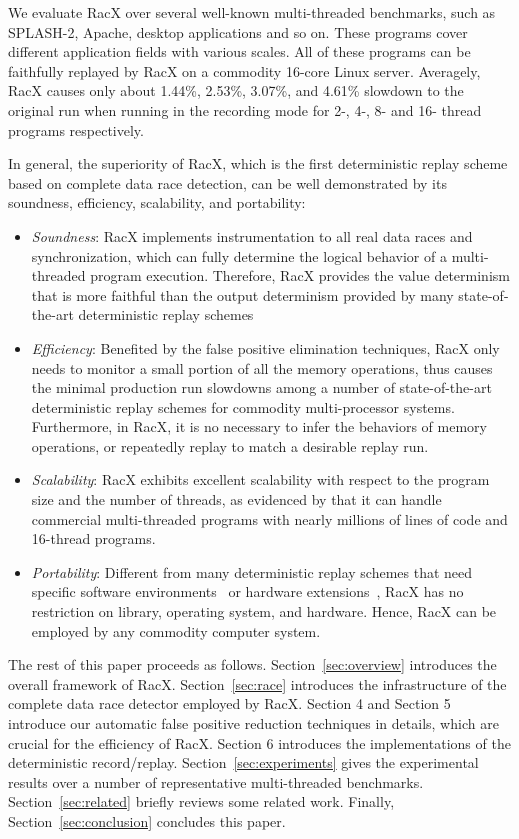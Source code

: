 \documentclass[10pt,onecolumn,letterpaper]{article}
\begin{document}
We evaluate RacX over several well-known multi-threaded benchmarks,
such as SPLASH-2, Apache, desktop applications and so on. These
programs cover different application fields with various scales. All
of these programs can be faithfully replayed by RacX on a commodity
16-core Linux server. Averagely, RacX causes only about 1.44\%,
2.53\%, 3.07\%, and 4.61\% slowdown to the original run when running
in the recording mode for 2-, 4-, 8- and 16- thread programs
respectively.

In general, the superiority of RacX, which is the first
deterministic replay scheme based on complete data race detection,
can be well demonstrated by its soundness, efficiency, scalability,
and portability:
\begin{itemize}
\item \emph{Soundness}: RacX implements instrumentation to all real data races and synchronization,
which can fully determine the logical behavior of a multi-threaded
program execution. Therefore, RacX provides the value determinism
that is more faithful than the output determinism provided by many
state-of-the-art deterministic replay schemes \item \emph{Efficiency}: Benefited by the false positive elimination techniques,
RacX only needs to monitor a small portion of all the memory
operations, thus causes the minimal production run slowdowns among a
number of state-of-the-art deterministic replay schemes for
commodity multi-processor systems. Furthermore, in
RacX, it is no necessary to infer the behaviors of memory
operations, or repeatedly replay to match a desirable replay run.
\item\emph{Scalability}: RacX exhibits excellent scalability with
respect to the program size and the number of threads, as evidenced
 by that it can handle commercial multi-threaded programs with nearly millions of lines of code and 16-thread programs.
\item\emph{Portability}: Different from many deterministic replay schemes that need specific software
environments~\cite{Dunlap08VEE,Guo08OSDI,Olszewski09ASPLOS,Lee10ASPLOS,Veeraraghavan11ASPLOS}
or hardware
extensions~\cite{Hower08ISCA,Montesinos08ISCA,Voskuilen10ISCA}, RacX
has no restriction on library, operating system, and hardware.
Hence, RacX can be employed by any commodity computer system.
\end{itemize}

The rest of this paper proceeds as follows.
Section~\ref{sec:overview} introduces the overall framework of RacX.
Section~\ref{sec:race} introduces the infrastructure of the complete
data race detector employed by RacX. Section 4 and Section 5
introduce our automatic false positive reduction techniques in
details, which are crucial for the efficiency of RacX. Section 6
introduces the implementations of the deterministic record/replay.
Section~\ref{sec:experiments} gives the experimental results over a
number of representative multi-threaded benchmarks.
Section~\ref{sec:related} briefly reviews some related work.
Finally, Section~\ref{sec:conclusion} concludes this paper.
\end{document}
